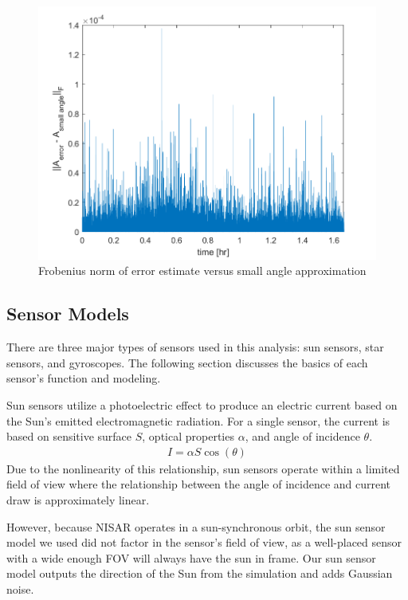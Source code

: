 \begin{figure}[H]
\centering
\includegraphics[scale=0.6]{Images/ps7_problem3.png}
\caption{Frobenius norm of error estimate versus small angle approximation}
\label{fig:ps7_problem3}
\end{figure}

\subsection{Sensor Models}
There are three major types of sensors used in this analysis: sun sensors, star sensors, and gyroscopes. The following section discusses the basics of each sensor's function and modeling.

Sun sensors utilize a photoelectric effect to produce an electric current based on the Sun's emitted electromagnetic radiation. For a single sensor, the current is based on sensitive surface $S$, optical properties $\alpha$, and angle of incidence $\theta$.
\begin{align*}
    I = \alpha S \cos(\theta)
\end{align*}
Due to the nonlinearity of this relationship, sun sensors operate within a limited field of view where the relationship between the angle of incidence and current draw is approximately linear.

However, because NISAR operates in a sun-synchronous orbit, the sun sensor model we used did not factor in the sensor's field of view, as a well-placed sensor with a wide enough FOV will always have the sun in frame. Our sun sensor model outputs the direction of the Sun from the simulation and adds Gaussian noise.

